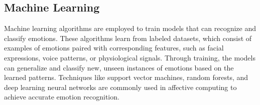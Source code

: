 \subsection{Machine Learning}

Machine learning algorithms are employed to train models that can recognize and classify emotions. 
These algorithms learn from labeled datasets, which consist of examples of emotions paired with corresponding features, such as facial expressions, voice patterns, or physiological signals. Through training, the models can generalize and classify new, unseen instances of emotions based on the learned patterns. 
Techniques like support vector machines, random forests, and deep learning neural networks are commonly used in affective computing to achieve accurate emotion recognition.